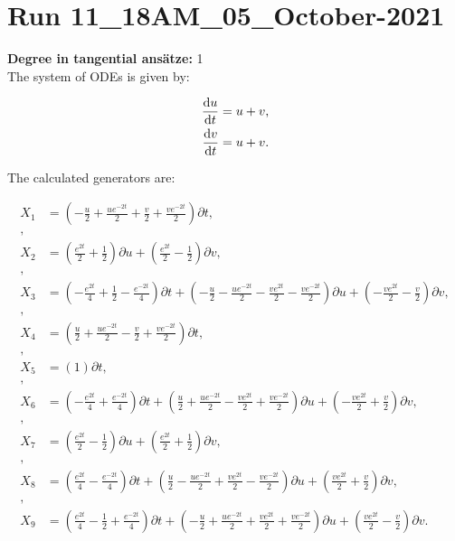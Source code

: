 \section*{Run 11\_18AM\_05\_October-2021}
\textbf{Degree in tangential ansätze:}	1\\
The system of ODEs is given by:

\begin{align*}
\dv{u}{t}&=u + v,\\
\dv{v}{t}&=u + v.\\
\end{align*}

\noindent The calculated generators are:

\begin{align*}
X_{1}&=\left( - \frac{u}{2} + \frac{u e^{- 2 t}}{2} + \frac{v}{2} + \frac{v e^{- 2 t}}{2} \right)\partial t,\\
,\\
X_{2}&=\left( \frac{e^{2 t}}{2} + \frac{1}{2} \right)\partial u+\left( \frac{e^{2 t}}{2} - \frac{1}{2} \right)\partial v,\\
,\\
X_{3}&=\left( - \frac{e^{2 t}}{4} + \frac{1}{2} - \frac{e^{- 2 t}}{4} \right)\partial t+\left( - \frac{u}{2} - \frac{u e^{- 2 t}}{2} - \frac{v e^{2 t}}{2} - \frac{v e^{- 2 t}}{2} \right)\partial u+\left( - \frac{v e^{2 t}}{2} - \frac{v}{2} \right)\partial v,\\
,\\
X_{4}&=\left( \frac{u}{2} + \frac{u e^{- 2 t}}{2} - \frac{v}{2} + \frac{v e^{- 2 t}}{2} \right)\partial t,\\
,\\
X_{5}&=\left( 1 \right)\partial t,\\
,\\
X_{6}&=\left( - \frac{e^{2 t}}{4} + \frac{e^{- 2 t}}{4} \right)\partial t+\left( \frac{u}{2} + \frac{u e^{- 2 t}}{2} - \frac{v e^{2 t}}{2} + \frac{v e^{- 2 t}}{2} \right)\partial u+\left( - \frac{v e^{2 t}}{2} + \frac{v}{2} \right)\partial v,\\
,\\
X_{7}&=\left( \frac{e^{2 t}}{2} - \frac{1}{2} \right)\partial u+\left( \frac{e^{2 t}}{2} + \frac{1}{2} \right)\partial v,\\
,\\
X_{8}&=\left( \frac{e^{2 t}}{4} - \frac{e^{- 2 t}}{4} \right)\partial t+\left( \frac{u}{2} - \frac{u e^{- 2 t}}{2} + \frac{v e^{2 t}}{2} - \frac{v e^{- 2 t}}{2} \right)\partial u+\left( \frac{v e^{2 t}}{2} + \frac{v}{2} \right)\partial v,\\
,\\
X_{9}&=\left( \frac{e^{2 t}}{4} - \frac{1}{2} + \frac{e^{- 2 t}}{4} \right)\partial t+\left( - \frac{u}{2} + \frac{u e^{- 2 t}}{2} + \frac{v e^{2 t}}{2} + \frac{v e^{- 2 t}}{2} \right)\partial u+\left( \frac{v e^{2 t}}{2} - \frac{v}{2} \right)\partial v.\\
\end{align*}
